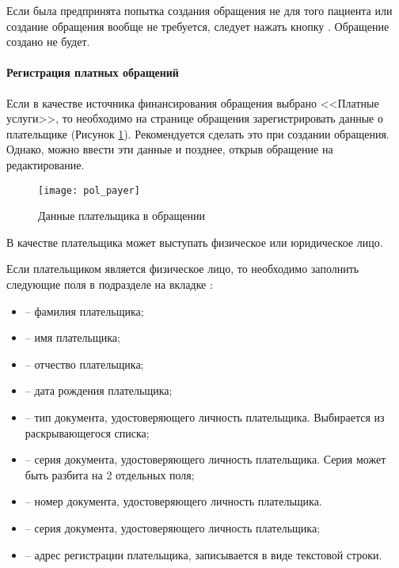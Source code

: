 Если была предпринята попытка создания обращения не для того пациента или создание обращения вообще не требуется, следует нажать кнопку . Обращение создано не будет.

\paragraph{Регистрация платных обращений}

Если в качестве источника финансирования обращения выбрано <<Платные услуги>>, то необходимо на странице обращения зарегистрировать данные о плательщике (Рисунок \ref{img_pol_payer}). Рекомендуется сделать это при создании обращения. Однако, можно ввести эти данные и позднее, открыв обращение на редактирование. 

\begin{figure}[ht]\centering
	\texttt{[image: pol\_payer]}
	\caption{Данные плательщика в обращении}
	\label{img_pol_payer}
\end{figure}

В качестве плательщика может выступать физическое или юридическое лицо.

Если плательщиком является физическое лицо, то необходимо заполнить следующие поля в подразделе  на вкладке :
\begin{itemize}
	\item {} -- фамилия плательщика;
	\item {} -- имя плательщика;
	\item {} -- отчество плательщика;
	\item {} -- дата рождения плательщика;
	\item {} -- тип документа, удостоверяющего личность плательщика. Выбирается из раскрывающегося списка;
	\item {} -- серия документа, удостоверяющего личность плательщика. Серия может быть разбита на 2 отдельных поля;
	\item {} -- номер документа, удостоверяющего личность плательщика. 
	\item {} -- серия документа, удостоверяющего личность плательщика;
	\item {} -- адрес регистрации плательщика, записывается в виде текстовой строки. 
\end{itemize}

